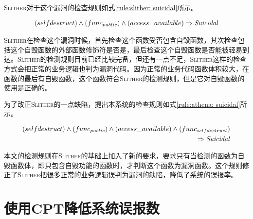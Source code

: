 \textsc{Slither}对于这个漏洞的检查规则如式\ref{rule:slither: suicidal}所示。
\begin{mdframed}[
	linewidth = 1pt,
	innertopmargin = -5pt,
	innerbottommargin = 3pt,
	outerlinewidth = 1pt
	]
    \small
	\begin{equation} \label{rule:slither: suicidal}
    (selfdestruct) \wedge (func_{public}) \wedge (access\_available) \Rightarrow \text{\emph{Suicidal}}
	\end{equation}
\end{mdframed}
\textsc{Slither}在检查这个漏洞时候，首先检查这个函数受否包含自毁函数，其次检查包括这个自毁函数的外部函数修饰符是否是，最后检查这个自毁函数是否能被轻易到达。\textsc{Slither}的检测规则目前已经比较完备，但还有一点不足，\textsc{Slither}这样的检查方式会把正常的业务逻辑也判为漏洞代码。因为正常的业务代码函数体积较大，在函数的最后有自毁函数，这个函数符合\textsc{Slither}的检测规则，但是它对自毁函数的使用是正确的。

为了改正\textsc{Slither}的一点缺陷，提出本系统的检查规则如式\ref{rule:athena: suicidal}所示。
\begin{mdframed}[
	linewidth = 1pt,
	innertopmargin = -10pt,
	innerbottommargin = 3pt,
	outerlinewidth = 1pt
	]
    \small
	\begin{equation} \label{rule:athena: suicidal}
    \begin{split}
       (selfdestruct) \wedge (func_{public}) \wedge (access\_available) \wedge (func_{selfdestruct}) \\
       \Rightarrow \text{\emph{Suicidal}}
    \end{split}
	\end{equation}
\end{mdframed}
本文的检测规则在\textsc{Slither}的基础上加入了新的要求，要求只有当检测的函数为自毁函数体，即只包含自毁功能的函数时，才判断这个函数为漏洞函数。这个规则修正了\textsc{Slither}把很多正常的业务逻辑误判为漏洞的缺陷，降低了系统的误报率。

\section{使用CPT降低系统误报数}\label{sec:ss}

